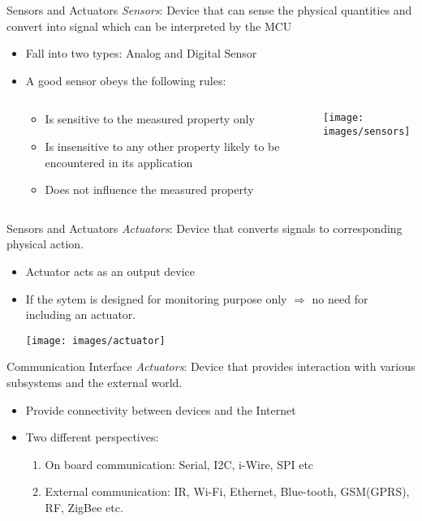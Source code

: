 \documentclass{beamer}
\begin{document}
\begin{darkframes}
\begin{frame}[<+->]{Sensors and Actuators}
	\emph{Sensors}: Device that can sense the physical quantities and convert into signal which can be interpreted by the MCU
	\begin{itemize}
		\item Fall into two types: Analog and Digital Sensor
		\item A good sensor obeys the following rules:
		\begin{columns}
			\begin{column}{0.5\textwidth}
		\begin{itemize}
			\item Is sensitive to the measured property only
			\item Is insensitive to any other property likely to be encountered in its application
		   \item	Does not influence the measured property
		\end{itemize}
	\end{column}
	\begin{column}{0.5\textwidth}
		\begin{center}
			\texttt{[image: images/sensors]} 
		\end{center}
	\end{column}
\end{columns}
	\end{itemize}
\end{frame}

\begin{frame}[<+->]{Sensors and Actuators}
	\emph{Actuators}: Device that converts signals to corresponding physical action.
	\begin{itemize}
		\item Actuator acts as an output device
		\item If the sytem is designed for monitoring purpose only $\Rightarrow$ no need for including an actuator.
				\begin{center}
					\texttt{[image: images/actuator]} 
				\end{center}
	\end{itemize}
\end{frame}

\begin{frame}[<+->]{Communication Interface}
	\emph{Actuators}: Device that provides interaction with various subsystems and the external world.
	\begin{itemize}
		\item Provide connectivity between devices and the Internet
		\item Two different perspectives:
		\begin{enumerate}
			\item On board communication: Serial, I2C, i-Wire, SPI etc
			\item External communication: IR, Wi-Fi, Ethernet, Blue-tooth, GSM(GPRS), RF, ZigBee etc.
		\end{enumerate} 
	\end{itemize}
\end{frame}


\end{darkframes}
\end{document}
